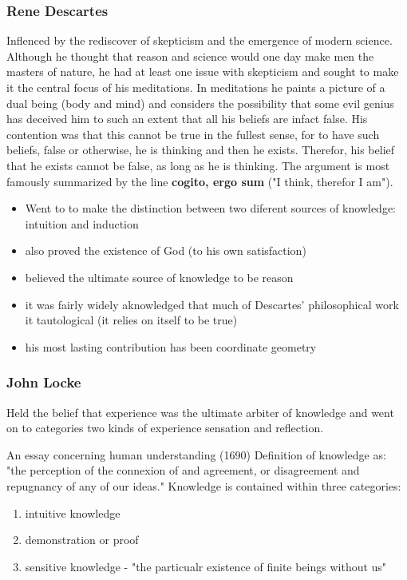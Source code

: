 \documentclass[11pt]{article}
\begin{document}
\subsubsection{Rene Descartes}
\label{sec:orga1f96dd}
Inflenced by the rediscover of skepticism and the emergence of modern 
science. Although he thought that reason and science would one day make
men the masters of nature, he had at least one issue with skepticism 
and sought to make it the central focus of his meditations. In meditations
he paints a picture of a dual being (body and mind) and considers the 
possibility that some evil genius has deceived him to such an extent
that all his beliefs are infact false. His contention was that this cannot 
be true in the fullest sense, for to have such beliefs, false or otherwise,
he is thinking and then he exists. Therefor, his belief that he exists 
cannot be false, as long as he is thinking. The argument is most famously 
summarized by the line \textbf{cogito, ergo sum} ("I think, therefor I am").

\begin{itemize}
\item Went to to make the distinction between two diferent sources of knowledge:
intuition and induction
\item also proved the existence of God (to his own satisfaction)
\item believed the ultimate source of knowledge to be reason
\item it was fairly widely aknowledged that much of Descartes' philosophical 
work it tautological (it relies on itself to be true)
\item his most lasting contribution has been coordinate geometry
\end{itemize}

\subsubsection{John Locke}
\label{sec:org814eead}
Held the belief that experience was the ultimate arbiter of knowledge and 
went on to categories two kinds of experience sensation and reflection. 

An essay concerning human understanding (1690)
Definition of knowledge as: "the perception of the connexion of and agreement,
or disagreement and repugnancy of any of our ideas."
Knowledge is contained within three categories:
\begin{enumerate}
\item intuitive knowledge
\item demonstration or proof
\item sensitive knowledge - "the particualr existence of finite beings without us"
\end{enumerate}
\end{document}
